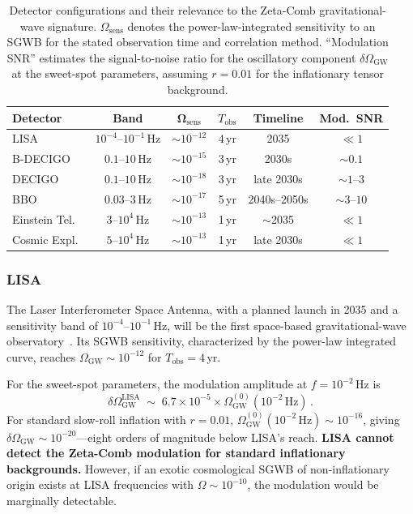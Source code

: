\documentclass[12pt,a4paper]{article}
\begin{document}
\begin{table}[t]
\centering
\renewcommand{\arraystretch}{1.3}
\caption{%
  Detector configurations and their relevance to the
  Zeta-Comb gravitational-wave signature.
  $\Omega_{\mathrm{sens}}$ denotes the
  power-law-integrated sensitivity to an SGWB
  for the stated observation time and correlation
  method.  ``Modulation SNR'' estimates the
  signal-to-noise ratio for the oscillatory
  component $\delta\Omega_{\mathrm{GW}}$
  at the sweet-spot parameters, assuming
  $r=0.01$ for the inflationary tensor background.}
\label{tab:detectors}
\begin{tabular}{lccccc}
\hline
\textbf{Detector}
  & \textbf{Band}
  & $\boldsymbol{\Omega_{\mathrm{sens}}}$
  & \textbf{$T_{\mathrm{obs}}$}
  & \textbf{Timeline}
  & \textbf{Mod.\ SNR} \\
\hline
LISA
  & $10^{-4}$--$10^{-1}\,$Hz
  & $\sim 10^{-12}$
  & 4\,yr
  & 2035
  & $\ll 1$ \\
B-DECIGO
  & $0.1$--$10\,$Hz
  & $\sim 10^{-15}$
  & 3\,yr
  & 2030s
  & $\sim 0.1$ \\
DECIGO
  & $0.1$--$10\,$Hz
  & $\sim 10^{-18}$
  & 3\,yr
  & late 2030s
  & $\sim 1$--$3$ \\
BBO
  & $0.03$--$3\,$Hz
  & $\sim 10^{-17}$
  & 5\,yr
  & 2040s--2050s
  & $\sim 3$--$10$ \\
Einstein Tel.\
  & $3$--$10^4\,$Hz
  & $\sim 10^{-13}$
  & 1\,yr
  & $\sim$2035
  & $\ll 1$ \\
Cosmic Expl.\
  & $5$--$10^4\,$Hz
  & $\sim 10^{-13}$
  & 1\,yr
  & late 2030s
  & $\ll 1$ \\
\hline
\end{tabular}
\end{table}


\subsubsection{LISA}

The Laser Interferometer Space Antenna, with a
planned launch in 2035 and a sensitivity band of
$10^{-4}$--$10^{-1}\,$Hz, will be the first
space-based gravitational-wave
observatory~\cite{LISA2024}.
Its SGWB sensitivity, characterized by the
power-law integrated curve, reaches
$\Omega_{\mathrm{GW}}\sim 10^{-12}$ for
$T_{\mathrm{obs}}=4\,$yr.

For the sweet-spot parameters, the modulation
amplitude at $f=10^{-2}\,$Hz is
\begin{equation}
  \delta\Omega_{\mathrm{GW}}^{\mathrm{LISA}}
  \;\sim\;
  6.7\times 10^{-5} \times
  \Omega_{\mathrm{GW}}^{(0)}(10^{-2}\,\text{Hz})\,.
\end{equation}
For standard slow-roll inflation with $r=0.01$,
$\Omega_{\mathrm{GW}}^{(0)}(10^{-2}\,\text{Hz})
\sim 10^{-16}$,
giving
$\delta\Omega_{\mathrm{GW}}\sim 10^{-20}$---eight
orders of magnitude below LISA's reach.
\textbf{LISA cannot detect the Zeta-Comb modulation
for standard inflationary backgrounds.}
However, if an exotic cosmological SGWB of non-inflationary
origin exists at LISA frequencies with
$\Omega\sim 10^{-10}$, the modulation would be
marginally detectable.
\end{document}
